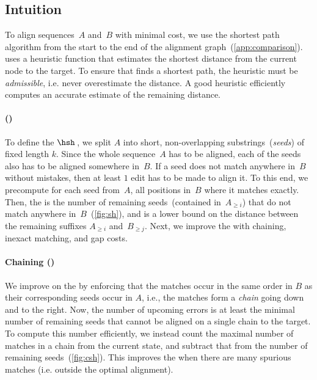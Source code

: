 \subsection{Intuition} \label{sec:intuition}

To align sequences~$A$ and~$B$ with minimal cost, we use the \A shortest path
algorithm from the start to the end of the alignment
graph~(\cref{app:comparison}). \A uses a heuristic function that estimates the
shortest distance from the current node to the target. To ensure that \A finds a
shortest path, the heuristic must be \emph{admissible}, i.e. never overestimate
the distance. A good heuristic efficiently computes an accurate estimate of
the remaining distance.

\paragraph{\Sh (\SH)} To define the \emph{\sh} $\hsh$\,, we split $A$ into short,
non-overlapping substrings~(\emph{seeds}) of fixed length $k$. Since the whole
sequence~$A$ has to be aligned, each of the seeds also has to be aligned
somewhere in~$B$. If a seed does not match anywhere in~$B$ without mistakes,
then at least $1$ edit has to be made to align it. To this end, we precompute
for each seed from~$A$, all positions in~$B$ where it matches exactly. Then, the
\SH is the number of remaining seeds~(contained in~$A_{\geq i}$) that do not
match anywhere in~$B$~(\cref{fig:sh}), and is a lower bound on the distance
between the remaining suffixes $A_{\geq i}$ and~$B_{\geq j}$. Next, we improve
the \sh with chaining, inexact matching, and gap costs.

\paragraph{Chaining (\CSH)} We improve on the \SH by enforcing that the matches
occur in the same order in $B$ as their corresponding seeds occur in $A$, i.e.,
the matches form a \emph{chain} going down and to the right. Now, the number of
upcoming errors is at least the minimal number of remaining seeds that cannot be
aligned on a single chain to the target. To compute this number efficiently, we
instead count the maximal number of matches in a chain from the current state,
and subtract that from the number of remaining seeds~(\cref{fig:csh}). This
improves the \sh when there are many spurious matches (i.e. outside the optimal
alignment).

